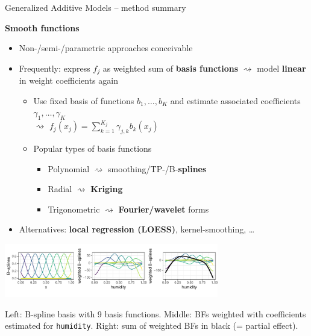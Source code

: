 \documentclass[11pt,compress,t,notes=noshow, xcolor=table]{beamer}
\newcommand{\highlight}[1]{\textcolor{hlcol}{\textbf{#1}}}
\begin{document}
\begin{frame2}{Generalized Additive Models -- method summary}

\highlight{Smooth functions}

\begin{itemize}
  \item Non-/semi-/parametric approaches conceivable
  \item Frequently: express $f_j$ as weighted sum of \textbf{basis functions}
  $\rightsquigarrow$ model \textbf{linear} in weight coefficients again
  \begin{itemize}
      \item Use fixed basis of functions $b_1, \dots, b_K$ and estimate
      associated coefficients $\gamma_1, \dots, \gamma_K$ \\ $\rightsquigarrow$
      $f_j(x_j) = \textstyle \sum_{k=1}^{K_j} \gamma_{j, k} b_k(x_j)$
      \item Popular types of basis functions
      \begin{itemize}
        \footnotesize
        \item Polynomial $\rightsquigarrow$ smoothing/TP-/B-\textbf{splines}
        \item Radial $\rightsquigarrow$ \textbf{Kriging}
        \item Trigonometric $\rightsquigarrow$ \textbf{Fourier/wavelet} forms
      \end{itemize}
    \end{itemize}
    \item Alternatives: \textbf{local regression (LOESS)},
    kernel-smoothing, \dots
\end{itemize}

\includegraphics[width=0.7\textwidth]{figure/gam_bike_spline_basis}

\tiny
Left: B-spline basis with 9 basis functions.
Middle: BFs weighted with coefficients estimated for
\texttt{humidity}.
Right: sum of weighted BFs in black (= partial effect).

\end{frame2}
\end{document}
